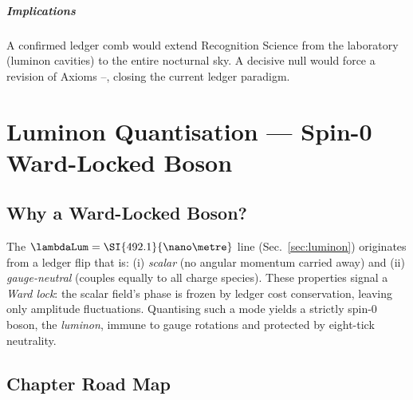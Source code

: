 \documentclass[11pt,oneside]{book}
\begin{document}
{\paragraph*{Implications}

A confirmed ledger comb would extend Recognition Science from the
laboratory (luminon cavities) to the entire nocturnal sky.  
A decisive null would force a revision of Axioms –,
closing the current ledger paradigm.


\chapter{Luminon Quantisation — Spin-0 Ward-Locked Boson}
\label{sec:luminon-quantisation}

\section{Why a Ward-Locked Boson?}

The \(\lambdaLum = \SI{492.1}{\nano\metre}\) line
(Sec.~\ref{sec:luminon}) originates from a ledger flip that is:
(i) \emph{scalar} (no angular momentum carried away) and  
(ii) \emph{gauge-neutral} (couples equally to all charge species).  
These properties signal a \textit{Ward lock}: the scalar field’s phase
is frozen by ledger cost conservation, leaving only amplitude
fluctuations.  Quantising such a mode yields a strictly spin-0 boson,
the \emph{luminon}, immune to gauge rotations and protected by
eight-tick neutrality.

\section{Chapter Road Map}

}
\end{document}
